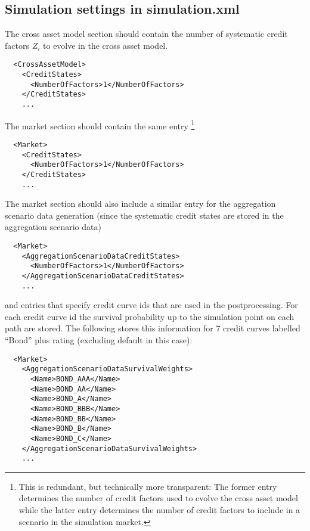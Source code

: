 \documentclass[12pt, a4paper]{article}
\begin{document}
\subsection{Simulation settings in simulation.xml}

The cross asset model section should contain the number of systematic credit factors $Z_i$ to evolve in the cross asset
model.

\begin{verbatim}
  <CrossAssetModel>
    <CreditStates>
      <NumberOfFactors>1</NumberOfFactors>
    </CreditStates>
    ...
\end{verbatim}

The market section should contain the same entry \footnote{This is redundant, but technically more transparent: The former entry determines the number of credit factors used to evolve the cross asset model while the latter entry determines the number of credit factors to include in a scenario in the simulation market.}

\begin{verbatim}
  <Market>
    <CreditStates>
      <NumberOfFactors>1</NumberOfFactors>
    </CreditStates>
    ...
\end{verbatim}

The market section should also include a similar entry for the aggregation scenario data generation (since the systematic credit states are stored in the aggregation scenario data)

\begin{verbatim}
  <Market>
    <AggregationScenarioDataCreditStates>
      <NumberOfFactors>1</NumberOfFactors>
    </AggregationScenarioDataCreditStates>
    ...
\end{verbatim}

and entries that specify credit curve ids that are used in the postprocessing. For each credit curve id the survival probability up to the simulation point on each path are stored. The following stores this information for $7$ credit curves labelled ``Bond'' plus rating (excluding default in this case):

\begin{verbatim}
  <Market>
    <AggregationScenarioDataSurvivalWeights>
      <Name>BOND_AAA</Name>
      <Name>BOND_AA</Name>
      <Name>BOND_A</Name>
      <Name>BOND_BBB</Name>
      <Name>BOND_BB</Name>
      <Name>BOND_B</Name>
      <Name>BOND_C</Name>
    </AggregationScenarioDataSurvivalWeights>
    ...
\end{verbatim}
\end{document}

